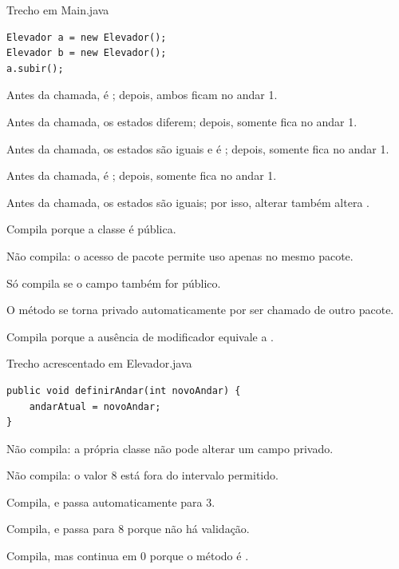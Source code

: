 \documentclass[11pt,a4paper]{article}
\begin{document}
\begin{minipage}[t]{.485\textwidth}
\begin{painelEvolucao}{Trecho em Main.java}
\begin{lstlisting}[style=questaocodigo]
Elevador a = new Elevador();
Elevador b = new Elevador();
a.subir();
\end{lstlisting}
\end{painelEvolucao}
\begin{alternativas}
\item Antes da chamada,  é ; depois, ambos ficam no andar 1.
\item Antes da chamada, os estados diferem; depois, somente  fica no andar 1.
\item Antes da chamada, os estados são iguais e  é ; depois, somente  fica no andar 1.
\item Antes da chamada,  é ; depois, somente  fica no andar 1.
\item Antes da chamada, os estados são iguais; por isso, alterar  também altera .
\end{alternativas}
\begin{alternativas}
\item Compila porque a classe  é pública.
\item Não compila: o acesso de pacote permite uso apenas no mesmo pacote.
\item Só compila se o campo  também for público.
\item O método se torna privado automaticamente por ser chamado de outro pacote.
\item Compila porque a ausência de modificador equivale a .
\end{alternativas}
\begin{painelEvolucao}{Trecho acrescentado em Elevador.java}
\begin{lstlisting}[style=questaocodigo]
public void definirAndar(int novoAndar) {
    andarAtual = novoAndar;
}
\end{lstlisting}
\end{painelEvolucao}
\begin{alternativas}
\item Não compila: a própria classe não pode alterar um campo privado.
\item Não compila: o valor 8 está fora do intervalo permitido.
\item Compila, e  passa automaticamente para 3.
\item Compila, e  passa para 8 porque não há validação.
\item Compila, mas  continua em 0 porque o método é .
\end{alternativas}
\end{minipage}
\end{document}
